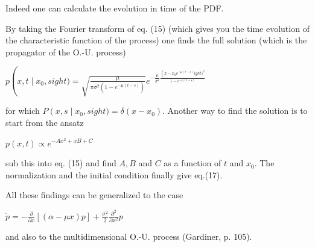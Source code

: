 Indeed one can calculate the evolution in time of the PDF.

By taking the Fourier transform of eq. (15) (which gives you the time evolution
of the characteristic function of the process) one finds the full solution
(which is the propagator of the O.-U. process)
\begin{DispWithArrows}[displaystyle, format=c]
  $p\left(x, t \mid x_{0}, s
ight)=\sqrt{\frac{\mu}{\pi \sigma^{2}\left(1-e^{-\mu(t-s)}\right)}} e^{-\frac{\mu}{\sigma^{2}} \frac{\left(x-x_{0} e^{-\mu(t-s)}
ight)^{2}}{1-e^{-\mu(t-s)}}}$
\end{DispWithArrows}
for which $P\left(x, s \mid x_{0}, s
ight)=\delta\left(x-x_{0}\right)$. Another
way to find the solution is to start from the ansatz
\begin{DispWithArrows}[displaystyle, format=c]
  $p(x, t) \propto e^{-A x^{2}+x B+C}$
\end{DispWithArrows}
sub this into eq. (15) and find $A, B$ and $C$ as a function of $t$ and $x_{0}$.
The normalization and the initial condition finally give eq.(17).

All these findings can be generalized to the case
\begin{DispWithArrows}[displaystyle, format=c]
  $\dot{p}=-\frac{\partial}{\partial x}[(\alpha-\mu x) p]+\frac{\sigma^{2}}{2} \frac{\partial^{2}}{\partial x^{2}} p$
\end{DispWithArrows}
and also to the multidimensional O.-U. process (Gardiner, p. 105).

